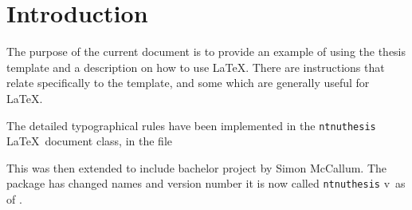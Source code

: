 \chapter{Introduction}
\label{chap:introduction}
The purpose of the current document is to provide an example of using the thesis template and a description on how to use \LaTeX. There are instructions that relate specifically to the template, and some which are generally useful for \LaTeX. 

The detailed typographical rules have been implemented in the
\texttt{ntnuthesis} \LaTeX\ document class, in the file 

This was then extended to include bachelor project by Simon McCallum.
The package has changed names and version number it is now called
\texttt{ntnuthesis}
v\ntnuthesisversion\ as of \ntnuthesisdate.